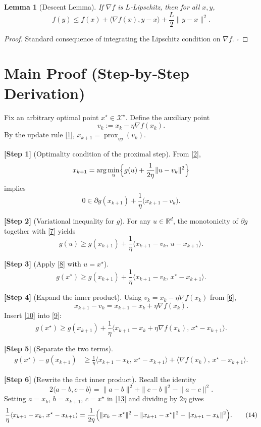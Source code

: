 \documentclass[11pt]{article}
\newtheorem{lemma}{Lemma}
\newcommand{\prox}{\operatorname{prox}}
\newcommand{\R}{\mathbb{R}}
\begin{document}
\begin{lemma}[Descent Lemma]\label{lem:descent}
If $\nabla f$ is $L$‑Lipschitz, then for all $x,y$,
\[
f(y)\le f(x)+\langle\nabla f(x),y-x\rangle+\frac{L}{2}\|y-x\|^{2}.
\tag{5}
\]
\end{lemma}
\begin{proof}
Standard consequence of integrating the Lipschitz condition on $\nabla f$. \hfill $\square$
\end{proof}

\section*{Main Proof (Step‑by‑Step Derivation)}
Fix an arbitrary optimal point $x^{\star}\in\mathcal{X}^{\star}$.  
Define the auxiliary point
\[
v_{k}:=x_{k}-\eta\nabla f(x_{k}).
\tag{6}
\]
By the update rule \eqref{1}, $x_{k+1}= \prox_{\eta g}(v_{k})$.

\bigskip
\noindent\textbf{[Step 1]} (Optimality condition of the proximal step).  
From \eqref{2},
\[
x_{k+1}= \arg\min_{u}\Bigl\{g(u)+\frac{1}{2\eta}\|u-v_{k}\|^{2}\Bigr\}
\]
implies
\[
0\in \partial g(x_{k+1})+\frac{1}{\eta}\bigl(x_{k+1}-v_{k}\bigr).
\tag{7}
\]

\noindent\textbf{[Step 2]} (Variational inequality for $g$).  
For any $u\in\R^{d}$, the monotonicity of $\partial g$ together with \eqref{7} yields
\[
g(u)\ge g(x_{k+1})+\frac{1}{\eta}\langle x_{k+1}-v_{k},\,u-x_{k+1}\rangle .
\tag{8}
\]

\noindent\textbf{[Step 3]} (Apply \eqref{8} with $u=x^{\star}$).  
\[
g(x^{\star})\ge g(x_{k+1})+\frac{1}{\eta}\langle x_{k+1}-v_{k},\,x^{\star}-x_{k+1}\rangle .
\tag{9}
\]

\noindent\textbf{[Step 4]} (Expand the inner product).  
Using $v_{k}=x_{k}-\eta\nabla f(x_{k})$ from \eqref{6},
\[
x_{k+1}-v_{k}=x_{k+1}-x_{k}+\eta\nabla f(x_{k}).
\tag{10}
\]
Insert \eqref{10} into \eqref{9}:
\[
g(x^{\star})\ge g(x_{k+1})+\frac{1}{\eta}
\bigl\langle x_{k+1}-x_{k}+\eta\nabla f(x_{k}),\,x^{\star}-x_{k+1}\bigr\rangle .
\tag{11}
\]

\noindent\textbf{[Step 5]} (Separate the two terms).  
\[
\begin{aligned}
g(x^{\star})-g(x_{k+1})
&\ge \frac{1}{\eta}\langle x_{k+1}-x_{k},\,x^{\star}-x_{k+1}\rangle
   +\langle \nabla f(x_{k}),\,x^{\star}-x_{k+1}\rangle .
\end{aligned}
\tag{12}
\]

\noindent\textbf{[Step 6]} (Rewrite the first inner product).  
Recall the identity
\[
2\langle a-b,c-b\rangle =\|a-b\|^{2}+\|c-b\|^{2}-\|a-c\|^{2}.
\tag{13}
\]
Setting $a=x_{k}$, $b=x_{k+1}$, $c=x^{\star}$ in \eqref{13} and dividing by $2\eta$ gives
\[
\frac{1}{\eta}\langle x_{k+1}-x_{k},\,x^{\star}-x_{k+1}\rangle
= \frac{1}{2\eta}\Bigl(\|x_{k}-x^{\star}\|^{2}
      -\|x_{k+1}-x^{\star}\|^{2}
      -\|x_{k+1}-x_{k}\|^{2}\Bigr).
\tag{14}
\]
\end{document}
